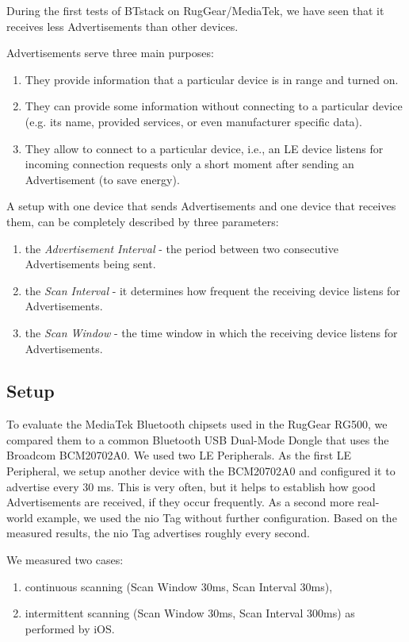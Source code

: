 \documentclass[a4paper,titlepage,oneside,12pt]{amsart} %
\begin{document}
During the first tests of BTstack on RugGear/MediaTek, we have seen that it receives less Advertisements than other devices.

Advertisements serve three main purposes:
\begin{enumerate}
\item They provide information that a particular device is in range and turned on.
\item They can provide some information without connecting to a particular device (e.g. its name, provided services, or even manufacturer specific data).
\item They allow to connect to a particular device, i.e., an LE device listens for incoming connection requests only a short moment after sending an Advertisement (to save energy).
\end{enumerate}

A setup with one device that sends Advertisements and one device that receives them, can be completely described by three parameters: 
\begin{enumerate}
\item the \emph{Advertisement Interval} - the period between two consecutive Advertisements being sent.
\item the \emph{Scan Interval} - it determines how frequent the receiving device listens for Advertisements.
\item the \emph{Scan Window} - the time window in which the receiving device listens for Advertisements.
\end{enumerate}

\subsection{Setup} To evaluate the MediaTek Bluetooth chipsets used in the RugGear RG500, we compared them to a common Bluetooth USB Dual-Mode Dongle that uses the Broadcom BCM20702A0. We used two LE Peripherals. As the first LE Peripheral, we setup another device with the BCM20702A0 and configured it to advertise every 30 ms. This is very often, but it helps to establish how good Advertisements are received, if they occur frequently. As a second more real-world example, we used the nio Tag without further configuration. Based on the measured results, the nio Tag advertises roughly every second. 

We measured two cases: 
\begin{enumerate}
\item continuous scanning (Scan Window 30ms, Scan Interval 30ms),
\item intermittent scanning (Scan Window 30ms, Scan Interval 300ms) as performed by iOS.
\end{enumerate}
\end{document}
